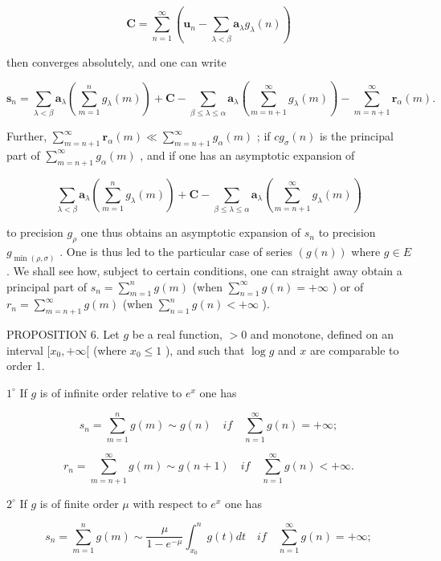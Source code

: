 \[
\mathbf {C} = \sum_ {n = 1} ^ {\infty} \left(\mathbf {u} _ {n} - \sum_ {\lambda <   \beta} \mathbf {a} _ {\lambda} g _ {\lambda} (n)\right)
\]

then converges absolutely, and one can write

\[
\mathbf {s} _ {n} = \sum_ {\lambda <   \beta} \mathbf {a} _ {\lambda} \left(\sum_ {m = 1} ^ {n} g _ {\lambda} (m)\right) + \mathbf {C} - \sum_ {\beta \leqslant \lambda \leqslant \alpha} \mathbf {a} _ {\lambda} \left(\sum_ {m = n + 1} ^ {\infty} g _ {\lambda} (m)\right) - \sum_ {m = n + 1} ^ {\infty} \mathbf {r} _ {\alpha} (m).
\]

Further, \(\sum_{m=n+1}^{\infty}\mathbf{r}_{\alpha}(m)\ll\sum_{m=n+1}^{\infty}g_{\alpha}(m)\) ; if \(cg_{\sigma}(n)\) is the principal part of \(\sum_{m=n+1}^{\infty}g_{\alpha}(m)\) , and if one has an asymptotic expansion of

\[
\sum_ {\lambda <   \beta} \mathbf {a} _ {\lambda} \left(\sum_ {m = 1} ^ {n} g _ {\lambda} (m)\right) + \mathbf {C} - \sum_ {\beta \leqslant \lambda \leqslant \alpha} \mathbf {a} _ {\lambda} \left(\sum_ {m = n + 1} ^ {\infty} g _ {\lambda} (m)\right)
\]

to precision \(g_{\rho}\) one thus obtains an asymptotic expansion of \(s_{n}\) to precision \(g_{\min(\rho,\sigma)}\) . One is thus led to the particular case of series \((g(n))\) where \(g \in E\) . We shall see how, subject to certain conditions, one can straight away obtain a principal part of \(s_{n} = \sum_{m=1}^{n} g(m)\) (when \(\sum_{n=1}^{\infty} g(n) = +\infty\) ) or of \(r_{n} = \sum_{m=n+1}^{\infty} g(m)\) (when \(\sum_{n=1}^{n} g(n) < +\infty\) ).

PROPOSITION 6. Let \(g\) be a real function, \(>0\) and monotone, defined on an interval \([x_0, +\infty[\) (where \(x_0 \leqslant 1\) ), and such that \(\log g\) and \(x\) are comparable to order 1.

\(1^{\circ}\) If \(g\) is of infinite order relative to \(e^{x}\) one has

\[
s _ {n} = \sum_ {m = 1} ^ {n} g (m) \sim g (n) \quad i f \quad \sum_ {n = 1} ^ {\infty} g (n) = + \infty ;\tag{1}
\]

\[
r _ {n} = \sum_ {m = n + 1} ^ {\infty} g (m) \sim g (n + 1) \quad i f \quad \sum_ {n = 1} ^ {\infty} g (n) <   + \infty .\tag{2}
\]

\(2^{\circ}\) If \(g\) is of finite order \(\mu\) with respect to \(e^{x}\) one has

\[
s _ {n} = \sum_ {m = 1} ^ {n} g (m) \sim \frac {\mu}{1 - e ^ {- \mu}} \int_ {x _ {0}} ^ {n} g (t) d t \quad i f \quad \sum_ {n = 1} ^ {\infty} g (n) = + \infty ;\tag{3}
\]

